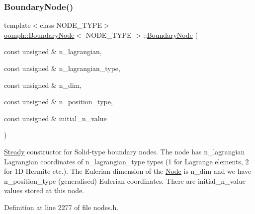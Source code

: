 \subsubsection{\texorpdfstring{Boundary\+Node()}{BoundaryNode()}\hspace{0.1cm}{\footnotesize\ttfamily [4/6]}}
{\footnotesize\ttfamily template$<$class N\+O\+D\+E\+\_\+\+T\+Y\+PE$>$ \\
\hyperlink{classoomph_1_1BoundaryNode}{oomph\+::\+Boundary\+Node}$<$ N\+O\+D\+E\+\_\+\+T\+Y\+PE $>$\+::\hyperlink{classoomph_1_1BoundaryNode}{Boundary\+Node} (\begin{DoxyParamCaption}\item[{const unsigned \&}]{n\+\_\+lagrangian,  }\item[{const unsigned \&}]{n\+\_\+lagrangian\+\_\+type,  }\item[{const unsigned \&}]{n\+\_\+dim,  }\item[{const unsigned \&}]{n\+\_\+position\+\_\+type,  }\item[{const unsigned \&}]{initial\+\_\+n\+\_\+value }\end{DoxyParamCaption})\hspace{0.3cm}{\ttfamily [inline]}}



\hyperlink{classoomph_1_1Steady}{Steady} constructor for Solid-\/type boundary nodes. The node has n\+\_\+lagrangian Lagrangian coordinates of n\+\_\+lagrangian\+\_\+type types (1 for Lagrange elements, 2 for 1D Hermite etc.). The Eulerian dimension of the \hyperlink{classoomph_1_1Node}{Node} is n\+\_\+dim and we have n\+\_\+position\+\_\+type (generalised) Eulerian coordinates. There are initial\+\_\+n\+\_\+value values stored at this node. 



Definition at line 2277 of file nodes.\+h.

\mbox{\label{classoomph_1_1BoundaryNode_a969b9b49766f702d755c71f3981cfe98}} 
